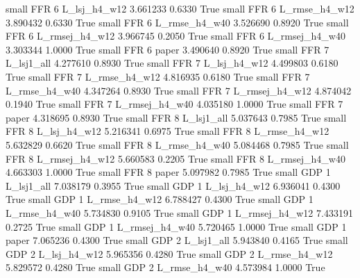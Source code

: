      small      FFR                 6   L_lsj_h4_w12   3.661233      0.6330    True
     small      FFR                 6  L_rmse_h4_w12   3.890432      0.6330    True
     small      FFR                 6  L_rmse_h4_w40   3.526690      0.8920    True
     small      FFR                 6 L_rmsej_h4_w12   3.966745      0.2050    True
     small      FFR                 6 L_rmsej_h4_w40   3.303344      1.0000    True
     small      FFR                 6          paper   3.490640      0.8920    True
     small      FFR                 7     L_lsj1_all   4.277610      0.8930    True
     small      FFR                 7   L_lsj_h4_w12   4.499803      0.6180    True
     small      FFR                 7  L_rmse_h4_w12   4.816935      0.6180    True
     small      FFR                 7  L_rmse_h4_w40   4.347264      0.8930    True
     small      FFR                 7 L_rmsej_h4_w12   4.874042      0.1940    True
     small      FFR                 7 L_rmsej_h4_w40   4.035180      1.0000    True
     small      FFR                 7          paper   4.318695      0.8930    True
     small      FFR                 8     L_lsj1_all   5.037643      0.7985    True
     small      FFR                 8   L_lsj_h4_w12   5.216341      0.6975    True
     small      FFR                 8  L_rmse_h4_w12   5.632829      0.6620    True
     small      FFR                 8  L_rmse_h4_w40   5.084468      0.7985    True
     small      FFR                 8 L_rmsej_h4_w12   5.660583      0.2205    True
     small      FFR                 8 L_rmsej_h4_w40   4.663303      1.0000    True
     small      FFR                 8          paper   5.097982      0.7985    True
     small      GDP                 1     L_lsj1_all   7.038179      0.3955    True
     small      GDP                 1   L_lsj_h4_w12   6.936041      0.4300    True
     small      GDP                 1  L_rmse_h4_w12   6.788427      0.4300    True
     small      GDP                 1  L_rmse_h4_w40   5.734830      0.9105    True
     small      GDP                 1 L_rmsej_h4_w12   7.433191      0.2725    True
     small      GDP                 1 L_rmsej_h4_w40   5.720465      1.0000    True
     small      GDP                 1          paper   7.065236      0.4300    True
     small      GDP                 2     L_lsj1_all   5.943840      0.4165    True
     small      GDP                 2   L_lsj_h4_w12   5.965356      0.4280    True
     small      GDP                 2  L_rmse_h4_w12   5.829572      0.4280    True
     small      GDP                 2  L_rmse_h4_w40   4.573984      1.0000    True
